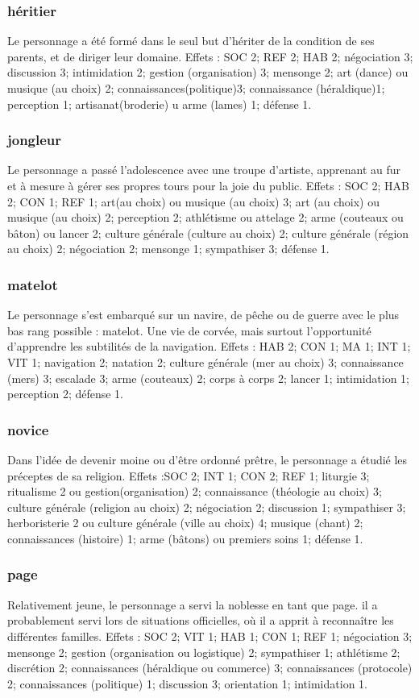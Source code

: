 \documentclass[10pt,a4paper,twocolumn]{book}
\begin{document}
\subsubsection{héritier}
Le personnage a été formé dans le seul but d’hériter de la condition de ses parents, et de diriger leur domaine.
Effets : SOC 2; REF 2; HAB 2; négociation 3; discussion 3; intimidation 2; gestion (organisation) 3; mensonge 2; art (dance) ou musique (au choix) 2; connaissances(politique)3; connaissance (héraldique)1; perception 1; artisanat(broderie) u arme (lames) 1; défense 1.
\subsubsection{jongleur}
Le personnage a passé l’adolescence avec une troupe d’artiste, apprenant au fur et à mesure à gérer ses propres tours pour la joie du public.
Effets : SOC 2; HAB 2; CON 1; REF 1; art(au choix) ou musique (au choix) 3; art (au choix) ou musique (au choix) 2; perception 2; athlétisme ou attelage 2; arme (couteaux ou bâton) ou lancer 2; culture générale (culture au choix) 2; culture générale (région au choix) 2; négociation 2; mensonge 1; sympathiser 3; défense 1.
\subsubsection{matelot}
Le personnage s’est embarqué sur un navire, de pêche ou de guerre avec le plus bas rang possible : matelot. Une vie de corvée, mais surtout l’opportunité d’apprendre les subtilités de la navigation.
Effets : HAB 2; CON 1; MA 1; INT 1; VIT 1; navigation 2; natation 2; culture générale (mer au choix) 3; connaissance (mers) 3; escalade 3; arme (couteaux) 2; corps à corps 2; lancer 1; intimidation 1; perception 2; défense 1.
\subsubsection{novice}
Dans l’idée de devenir moine ou d’être ordonné prêtre, le personnage a étudié les préceptes de sa religion.
Effets :SOC 2; INT 1; CON 2; REF 1; liturgie 3; ritualisme 2 ou gestion(organisation) 2; connaissance (théologie au choix) 3; culture générale (religion au choix) 2; négociation 2; discussion 1; sympathiser 3; herboristerie 2 ou culture générale (ville au choix) 4; musique (chant) 2; connaissances (histoire) 1; arme (bâtons) ou premiers soins 1; défense 1. 
\subsubsection{page}
Relativement jeune, le personnage a servi la noblesse en tant que page. il a probablement servi lors de situations officielles, où il a apprit à reconnaître les différentes familles.
Effets : SOC 2; VIT 1; HAB 1; CON 1; REF 1; négociation 3; mensonge 2; gestion (organisation ou logistique) 2; sympathiser 1; athlétisme 2; discrétion 2; connaissances (héraldique ou commerce) 3; connaissances (protocole) 2; connaissances (politique) 1; discussion 3; orientation 1; intimidation 1.
\end{document}
